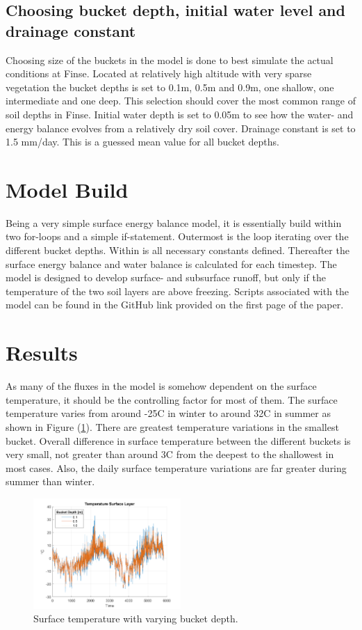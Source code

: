 \documentclass[a4paper,11pt,twocolumn]{article}
\begin{document}
\subsection{Choosing bucket depth, initial water level and drainage constant}
Choosing size of the buckets in the model is done to best simulate the actual conditions at Finse. Located at relatively high altitude with very sparse vegetation the bucket depths is set to 0.1m, 0.5m and 0.9m, one shallow, one intermediate and one deep. This selection should cover the most common range of soil depths in Finse. Initial water depth is set to 0.05m to see how the water- and energy balance evolves from a relatively dry soil cover. Drainage constant is set to 1.5 mm/day. This is a guessed mean value for all bucket depths.    


\section{Model Build}

Being a very simple surface energy balance model, it is essentially build within two for-loops and a simple if-statement. Outermost is the loop iterating over the different bucket depths. Within is all necessary constants defined. Thereafter the surface energy balance and water balance is calculated for each timestep. The model is designed to develop surface- and subsurface runoff, but only if the temperature of the two soil layers are above freezing. Scripts associated with the model can be found in the GitHub link provided on the first page of the paper.         

\section{Results}

As many of the fluxes in the model is somehow dependent on the surface temperature, it should be the controlling factor for most of them. The surface temperature varies from around -25\textdegree C in winter to around 32\textdegree C in summer as shown in Figure (\ref{fig:t1}). There are greatest temperature variations in the smallest bucket. Overall difference in surface temperature between the different buckets is very small, not greater than around 3\textdegree C from the deepest to the shallowest in most cases. Also, the daily surface temperature variations are far greater during summer than winter.  

\begin{figure}[h]
	\centering 
	\includegraphics[width=0.5\textwidth]{figures/t_surface}
	\caption{Surface temperature with varying bucket depth.}
	\label{fig:t1}
\end{figure} 
\end{document}
